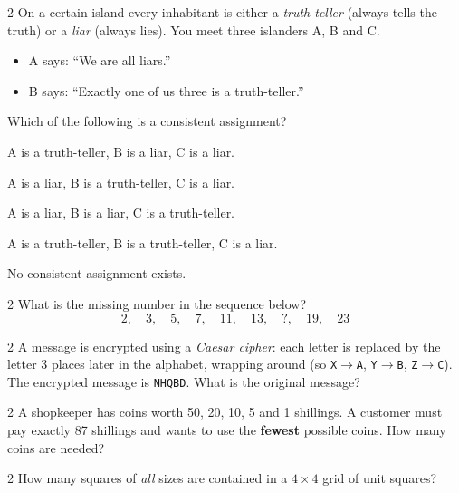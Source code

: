 \begin{problem}{2}
On a certain island every inhabitant is either a \emph{truth-teller}
(always tells the truth) or a \emph{liar} (always lies). You meet three
islanders A, B and C.

\begin{itemize}[nosep]
  \item A says: ``We are all liars.''
  \item B says: ``Exactly one of us three is a truth-teller.''
\end{itemize}

Which of the following is a consistent assignment?
\begin{mcqlong}
  \item A is a truth-teller, B is a liar, C is a liar.
  \item A is a liar, B is a truth-teller, C is a liar.
  \item A is a liar, B is a liar, C is a truth-teller.
  \item A is a truth-teller, B is a truth-teller, C is a liar.
  \item No consistent assignment exists.
\end{mcqlong}
\end{problem}

\begin{problem}{2}
What is the missing number in the sequence below?
\[
2,\quad 3,\quad 5,\quad 7,\quad 11,\quad 13,\quad ?,\quad 19,\quad 23
\]
\end{problem}

\begin{problem}{2}
A message is encrypted using a \emph{Caesar cipher}: each letter is
replaced by the letter 3 places later in the alphabet, wrapping around
(so \texttt{X}$\to$\texttt{A}, \texttt{Y}$\to$\texttt{B},
\texttt{Z}$\to$\texttt{C}). The encrypted message is \texttt{NHQBD}.
What is the original message?
\end{problem}

\begin{problem}{2}
A shopkeeper has coins worth 50, 20, 10, 5 and 1 shillings.
A customer must pay exactly 87 shillings and wants to use the
\textbf{fewest} possible coins. How many coins are needed?
\end{problem}

\begin{problem}{2}
How many squares of \emph{all} sizes are contained in a $4 \times 4$ grid
of unit squares?
\end{problem}

